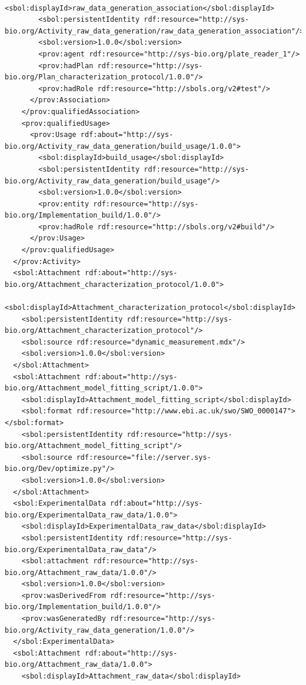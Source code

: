 \begin{lstlisting}
        <sbol:displayId>raw_data_generation_association</sbol:displayId>
        <sbol:persistentIdentity rdf:resource="http://sys-bio.org/Activity_raw_data_generation/raw_data_generation_association"/>
        <sbol:version>1.0.0</sbol:version>
        <prov:agent rdf:resource="http://sys-bio.org/plate_reader_1"/>
        <prov:hadPlan rdf:resource="http://sys-bio.org/Plan_characterization_protocol/1.0.0"/>
        <prov:hadRole rdf:resource="http://sbols.org/v2#test"/>
      </prov:Association>
    </prov:qualifiedAssociation>
    <prov:qualifiedUsage>
      <prov:Usage rdf:about="http://sys-bio.org/Activity_raw_data_generation/build_usage/1.0.0">
        <sbol:displayId>build_usage</sbol:displayId>
        <sbol:persistentIdentity rdf:resource="http://sys-bio.org/Activity_raw_data_generation/build_usage"/>
        <sbol:version>1.0.0</sbol:version>
        <prov:entity rdf:resource="http://sys-bio.org/Implementation_build/1.0.0"/>
        <prov:hadRole rdf:resource="http://sbols.org/v2#build"/>
      </prov:Usage>
    </prov:qualifiedUsage>
  </prov:Activity>
  <sbol:Attachment rdf:about="http://sys-bio.org/Attachment_characterization_protocol/1.0.0">
    <sbol:displayId>Attachment_characterization_protocol</sbol:displayId>
    <sbol:persistentIdentity rdf:resource="http://sys-bio.org/Attachment_characterization_protocol"/>
    <sbol:source rdf:resource="dynamic_measurement.mdx"/>
    <sbol:version>1.0.0</sbol:version>
  </sbol:Attachment>
  <sbol:Attachment rdf:about="http://sys-bio.org/Attachment_model_fitting_script/1.0.0">
    <sbol:displayId>Attachment_model_fitting_script</sbol:displayId>
    <sbol:format rdf:resource="http://www.ebi.ac.uk/swo/SWO_0000147"></sbol:format>
    <sbol:persistentIdentity rdf:resource="http://sys-bio.org/Attachment_model_fitting_script"/>
    <sbol:source rdf:resource="file://server.sys-bio.org/Dev/optimize.py"/>
    <sbol:version>1.0.0</sbol:version>
  </sbol:Attachment>
  <sbol:ExperimentalData rdf:about="http://sys-bio.org/ExperimentalData_raw_data/1.0.0">
    <sbol:displayId>ExperimentalData_raw_data</sbol:displayId>
    <sbol:persistentIdentity rdf:resource="http://sys-bio.org/ExperimentalData_raw_data"/>
    <sbol:attachment rdf:resource="http://sys-bio.org/Attachment_raw_data/1.0.0"/>
    <sbol:version>1.0.0</sbol:version>
    <prov:wasDerivedFrom rdf:resource="http://sys-bio.org/Implementation_build/1.0.0"/>
    <prov:wasGeneratedBy rdf:resource="http://sys-bio.org/Activity_raw_data_generation/1.0.0"/>
  </sbol:ExperimentalData>
  <sbol:Attachment rdf:about="http://sys-bio.org/Attachment_raw_data/1.0.0">
    <sbol:displayId>Attachment_raw_data</sbol:displayId>

\end{lstlisting}
